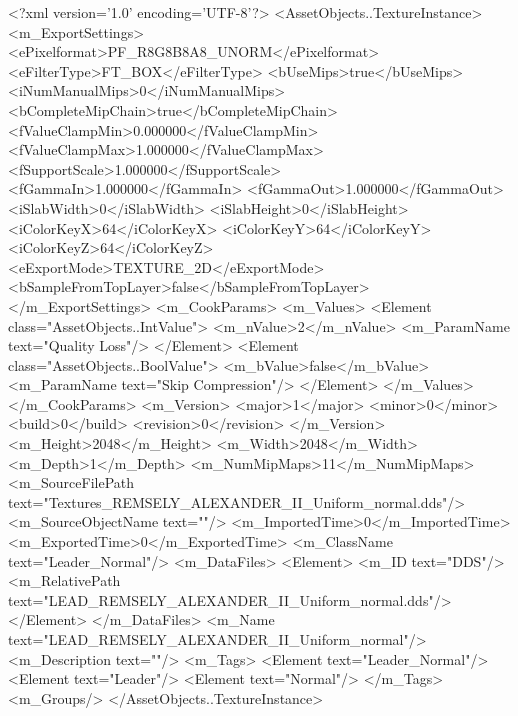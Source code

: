 <?xml version='1.0' encoding='UTF-8'?>
<AssetObjects..TextureInstance>
  <m_ExportSettings>
    <ePixelformat>PF_R8G8B8A8_UNORM</ePixelformat>
    <eFilterType>FT_BOX</eFilterType>
    <bUseMips>true</bUseMips>
    <iNumManualMips>0</iNumManualMips>
    <bCompleteMipChain>true</bCompleteMipChain>
    <fValueClampMin>0.000000</fValueClampMin>
    <fValueClampMax>1.000000</fValueClampMax>
    <fSupportScale>1.000000</fSupportScale>
    <fGammaIn>1.000000</fGammaIn>
    <fGammaOut>1.000000</fGammaOut>
    <iSlabWidth>0</iSlabWidth>
    <iSlabHeight>0</iSlabHeight>
    <iColorKeyX>64</iColorKeyX>
    <iColorKeyY>64</iColorKeyY>
    <iColorKeyZ>64</iColorKeyZ>
    <eExportMode>TEXTURE_2D</eExportMode>
    <bSampleFromTopLayer>false</bSampleFromTopLayer>
  </m_ExportSettings>
  <m_CookParams>
    <m_Values>
      <Element class="AssetObjects..IntValue">
        <m_nValue>2</m_nValue>
        <m_ParamName text="Quality Loss"/>
      </Element>
      <Element class="AssetObjects..BoolValue">
        <m_bValue>false</m_bValue>
        <m_ParamName text="Skip Compression"/>
      </Element>
    </m_Values>
  </m_CookParams>
  <m_Version>
    <major>1</major>
    <minor>0</minor>
    <build>0</build>
    <revision>0</revision>
  </m_Version>
  <m_Height>2048</m_Height>
  <m_Width>2048</m_Width>
  <m_Depth>1</m_Depth>
  <m_NumMipMaps>11</m_NumMipMaps>
  <m_SourceFilePath text="Textures\LEAD_REMSELY_ALEXANDER_II_Uniform_normal.dds"/>
  <m_SourceObjectName text=""/>
  <m_ImportedTime>0</m_ImportedTime>
  <m_ExportedTime>0</m_ExportedTime>
  <m_ClassName text="Leader_Normal"/>
  <m_DataFiles>
    <Element>
      <m_ID text="DDS"/>
      <m_RelativePath text="LEAD_REMSELY_ALEXANDER_II_Uniform_normal.dds"/>
    </Element>
  </m_DataFiles>
  <m_Name text="LEAD_REMSELY_ALEXANDER_II_Uniform_normal"/>
  <m_Description text=""/>
  <m_Tags>
    <Element text="Leader_Normal"/>
    <Element text="Leader"/>
    <Element text="Normal"/>
  </m_Tags>
  <m_Groups/>
</AssetObjects..TextureInstance>
